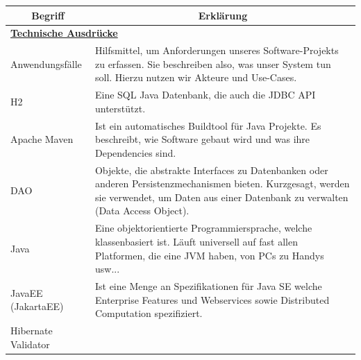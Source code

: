 \documentclass[enabledeprecatedfontcommands,fontsize=12pt,paper=a4,twoside]{scrartcl}
\begin{document}
\begin{longtable}[c]{|p{7cm}|p{8cm}|}
\hline
\multicolumn{1}{|c|}{\textbf{Begriff}} & \multicolumn{1}{c|}{\textbf{Erklärung}}                                                                                                                                                                                 \\ \hline
\endhead
%
\multicolumn{2}{|l|}{{\ul \textbf{Technische Ausdrücke}}}                                                                                                                                                                                                        \\ \hline
Anwendungsfälle                        & Hilfsmittel, um Anforderungen unseres Software-Projekts zu erfassen. Sie beschreiben also, was unser System tun soll. Hierzu nutzen wir Akteure und Use-Cases.                                                         \\ \hline
H2                                     & Eine SQL Java Datenbank, die auch die JDBC API unterstützt.                                                                                                                                                              \\ \hline
Apache Maven                           & Ist ein automatisches Buildtool für Java Projekte. Es beschreibt, wie Software gebaut wird und was ihre Dependencies sind.                                                                                              \\ \hline
DAO                                    & Objekte, die abstrakte Interfaces zu Datenbanken oder anderen Persistenzmechanismen bieten. Kurzgesagt, werden sie verwendet, um Daten aus einer Datenbank zu verwalten (Data Access Object).                             \\ \hline
Java                                   & Eine objektorientierte Programmiersprache, welche klassenbasiert ist. Läuft universell auf fast allen Platformen, die eine JVM haben, von PCs zu Handys usw...                                       \\ \hline
JavaEE (JakartaEE)                     & Ist eine Menge an Spezifikationen für Java SE welche Enterprise Features und Webservices sowie Distributed Computation spezifiziert.                                                                                    \\ \hline
Hibernate Validator                    &  \\ \hline

\end{longtable}
\end{document}
